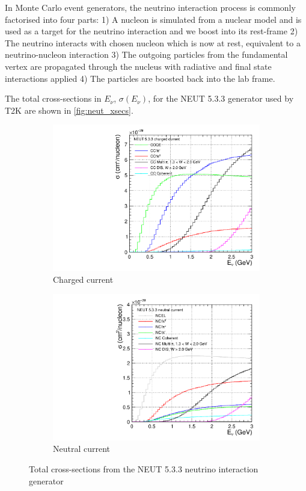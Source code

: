 In Monte Carlo event generators, the neutrino interaction process is commonly factorised into four parts: 1) A nucleon is simulated from a nuclear model and is used as a target for the neutrino interaction and we boost into its rest-frame 2) The neutrino interacts with chosen nucleon which is now at rest, equivalent to a neutrino-nucleon interaction 3) The outgoing particles from the fundamental vertex are propagated through the nucleus with radiative and final state interactions applied 4) The particles are boosted back into the lab frame.

The total cross-sections in $E_\nu$, $\sigma(E_\nu)$, for the NEUT 5.3.3\cite{neut} generator used by T2K are shown in \autoref{fig:neut_xsecs}.
\begin{figure}[h]
	\centering
	\begin{subfigure}[t]{0.42\textwidth}
		\includegraphics[width=\textwidth, trim={0mm 0mm 0mm 0mm}, clip,page=1]{figures/niwg/NEUT_533_xsecs}
		\caption{Charged current}
	\end{subfigure}
	\begin{subfigure}[t]{0.42\textwidth}
		\includegraphics[width=\textwidth, trim={0mm 0mm 0mm 0mm}, clip,page=1]{figures/niwg/NEUT_533_xsecs_NC}
		\caption{Neutral current}
	\end{subfigure}
	\caption{Total cross-sections from the NEUT 5.3.3\cite{neut} neutrino interaction generator}
	\label{fig:neut_xsecs}
\end{figure}

